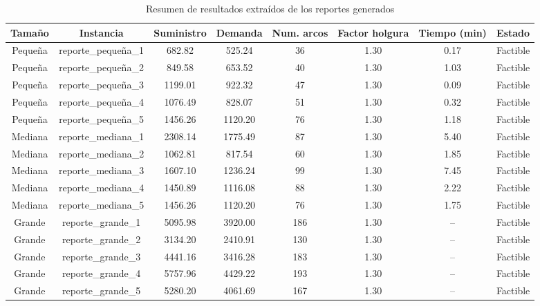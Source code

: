 \documentclass[a4paper,12pt]{article}
\begin{document}
\begin{table}[H]
\centering
\begin{tabular}{|c|c|c|c|c|c|c|c|}
\hline
\textbf{Tamaño} & \textbf{Instancia} & \textbf{Suministro} & \textbf{Demanda} & \textbf{Num. arcos} & \textbf{Factor holgura} & \textbf{Tiempo (min)} & \textbf{Estado} \\
\hline
Pequeña & reporte\_pequeña\_1 & 682.82 & 525.24 & 36 & 1.30 & 0.17 & Factible \\
Pequeña & reporte\_pequeña\_2 & 849.58 & 653.52 & 40 & 1.30 & 1.03 & Factible \\
Pequeña & reporte\_pequeña\_3 & 1199.01 & 922.32 & 47 & 1.30 & 0.09 & Factible \\
Pequeña & reporte\_pequeña\_4 & 1076.49 & 828.07 & 51 & 1.30 & 0.32 & Factible \\
Pequeña & reporte\_pequeña\_5 & 1456.26 & 1120.20 & 76 & 1.30 & 1.18 & Factible \\
Mediana & reporte\_mediana\_1 & 2308.14 & 1775.49 & 87 & 1.30 & 5.40 & Factible \\
Mediana & reporte\_mediana\_2 & 1062.81 & 817.54 & 60 & 1.30 & 1.85 & Factible \\
Mediana & reporte\_mediana\_3 & 1607.10 & 1236.24 & 99 & 1.30 & 7.45 & Factible \\
Mediana & reporte\_mediana\_4 & 1450.89 & 1116.08 & 88 & 1.30 & 2.22 & Factible \\
Mediana & reporte\_mediana\_5 & 1456.26 & 1120.20 & 76 & 1.30 & 1.75 & Factible \\
Grande & reporte\_grande\_1 & 5095.98 & 3920.00 & 186 & 1.30 & -- & Factible \\
Grande & reporte\_grande\_2 & 3134.20 & 2410.91 & 130 & 1.30 & -- & Factible \\
Grande & reporte\_grande\_3 & 4441.16 & 3416.28 & 183 & 1.30 & -- & Factible \\
Grande & reporte\_grande\_4 & 5757.96 & 4429.22 & 193 & 1.30 & -- & Factible \\
Grande & reporte\_grande\_5 & 5280.20 & 4061.69 & 167 & 1.30 & -- & Factible \\
\hline
\end{tabular}
\caption{Resumen de resultados extraídos de los reportes generados}
\end{table}

\end{document}
